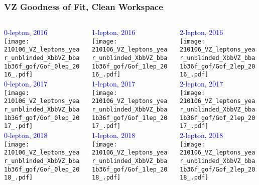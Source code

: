 \documentclass{beamer}
\newcommand{\beginbackup}{
  \newcounter{framenumbervorappendix}
  \setcounter{framenumbervorappendix}{\value{framenumber}}
}
\newcommand{\backupend}{
  \addtocounter{framenumbervorappendix}{-\value{framenumber}}
  \addtocounter{framenumber}{\value{framenumbervorappendix}}
}
\begin{document}
\begin{frame}
  \frametitle{VZ Goodness of Fit, Clean Workspace}

  \begin{columns}
    \begin{column}{0.3\linewidth}
      \centering
      \textcolor{blue}{0-lepton, 2016} \\
      \texttt{[image: 210106\_VZ\_leptons\_year\_unblinded\_XbbVZ\_bba1b36f\_gof/Gof\_0lep\_2016\_.pdf]} \\
      \textcolor{blue}{0-lepton, 2017} \\
      \texttt{[image: 210106\_VZ\_leptons\_year\_unblinded\_XbbVZ\_bba1b36f\_gof/Gof\_0lep\_2017\_.pdf]} \\
      \textcolor{blue}{0-lepton, 2018} \\
      \texttt{[image: 210106\_VZ\_leptons\_year\_unblinded\_XbbVZ\_bba1b36f\_gof/Gof\_0lep\_2018\_.pdf]}
    \end{column}
    \begin{column}{0.3\linewidth}
      \centering
      \textcolor{blue}{1-lepton, 2016} \\
      \texttt{[image: 210106\_VZ\_leptons\_year\_unblinded\_XbbVZ\_bba1b36f\_gof/Gof\_1lep\_2016\_.pdf]} \\
      \textcolor{blue}{1-lepton, 2017} \\
      \texttt{[image: 210106\_VZ\_leptons\_year\_unblinded\_XbbVZ\_bba1b36f\_gof/Gof\_1lep\_2017\_.pdf]} \\
      \textcolor{blue}{1-lepton, 2018} \\
      \texttt{[image: 210106\_VZ\_leptons\_year\_unblinded\_XbbVZ\_bba1b36f\_gof/Gof\_1lep\_2018\_.pdf]}
    \end{column}
    \begin{column}{0.3\linewidth}
      \centering
      \textcolor{blue}{2-lepton, 2016} \\
      \texttt{[image: 210106\_VZ\_leptons\_year\_unblinded\_XbbVZ\_bba1b36f\_gof/Gof\_2lep\_2016\_.pdf]} \\
      \textcolor{blue}{2-lepton, 2017} \\
      \texttt{[image: 210106\_VZ\_leptons\_year\_unblinded\_XbbVZ\_bba1b36f\_gof/Gof\_2lep\_2017\_.pdf]} \\
      \textcolor{blue}{2-lepton, 2018} \\
      \texttt{[image: 210106\_VZ\_leptons\_year\_unblinded\_XbbVZ\_bba1b36f\_gof/Gof\_2lep\_2018\_.pdf]}
    \end{column}
  \end{columns}

\end{frame}

\begin{comment}
\beginbackup

\begin{frame}
  \centering
    {\Huge \bf\sffamily Backup Slides}
\end{frame}



\backupend
\end{comment}
\end{document}
